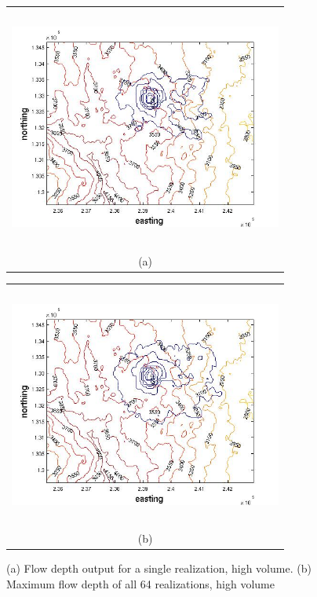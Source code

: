 \documentclass[a4paper,fleqn]{article}
\begin{document}
\begin{figure}[H]
    \begin{minipage}[b]{0.6\textwidth}
        \begin{tabular}{c}
        \includegraphics[width=9cm,height=8cm,keepaspectratio]{sample1_high_flow_res.jpg}\\
        (a)
        \end{tabular}
    \end{minipage}
    \begin{minipage}{0.6\textwidth}
        \begin{tabular}{c}
        \includegraphics[width=9cm,height=8cm,keepaspectratio]{all_high_flow_res.jpg}\\
        (b)
        \end{tabular}
    \end{minipage} 
\caption{(a) Flow depth output for a single realization, high volume. (b) Maximum flow depth of all 64 realizations, high volume }
\label{fig3}  
\end{figure}
\end{document}

